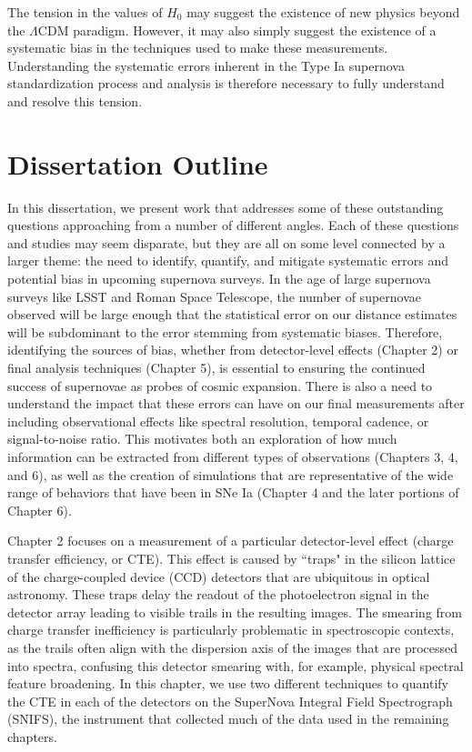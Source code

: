 The tension in the values of $H_0$ may suggest the existence of new physics beyond the $\Lambda$CDM paradigm. However, it may also simply suggest the existence of a systematic bias in the techniques used to make these measurements. Understanding the systematic errors inherent in the Type Ia supernova standardization process and analysis is therefore necessary to fully understand and resolve this tension.

\section{Dissertation Outline}
In this dissertation, we present work that addresses some of these outstanding questions approaching from a number of different angles. Each of these questions and studies may seem disparate, but they are all on some level connected by a larger theme: the need to identify, quantify, and mitigate systematic errors and potential bias in upcoming supernova surveys. In the age of large supernova surveys like LSST and Roman Space Telescope, the number of supernovae observed will be large enough that the statistical error on our distance estimates will be subdominant to the error stemming from systematic biases. Therefore, identifying the sources of bias, whether from detector-level effects (Chapter 2) or final analysis techniques (Chapter 5), is essential to ensuring the continued success of supernovae as probes of cosmic expansion. There is also a need to understand the impact that these errors can have on our final measurements after including observational effects like spectral resolution, temporal cadence, or signal-to-noise ratio. This motivates both an exploration of how much information can be extracted from different types of observations (Chapters 3, 4, and 6), as well as the creation of simulations that are representative of the wide range of behaviors that have been in SNe Ia (Chapter 4 and the later portions of Chapter 6).

Chapter 2 focuses on a measurement of a particular detector-level effect (charge transfer efficiency, or CTE). This effect is caused by ``traps" in the silicon lattice of the charge-coupled device (CCD) detectors that are ubiquitous in optical astronomy. These traps delay the readout of the photoelectron signal in the detector array leading to visible trails in the resulting images. The smearing from charge transfer inefficiency is particularly problematic in spectroscopic contexts, as the trails often align with the dispersion axis of the images that are processed into spectra, confusing this detector smearing with, for example, physical spectral feature broadening. In this chapter, we use two different techniques to quantify the CTE in each of the detectors on the SuperNova Integral Field Spectrograph (SNIFS), the instrument that collected much of the data used in the remaining chapters.

